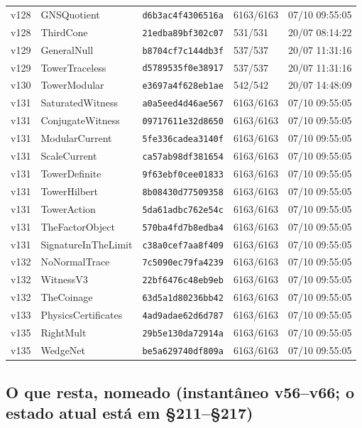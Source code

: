 \documentclass[11pt]{article}
\theoremstyle{definition}\newtheorem{deriv}{Derivação}
\begin{document}
{\begin{longtable}{@{}lllll@{}}
v128 & GNSQuotient & \texttt{d6b3ac4f4306516a} & 6163/6163 & 07/10 09:55:05 \\
v128 & ThirdCone & \texttt{21edba89bf302c07} & 531/531 & 20/07 08:14:22 \\
v129 & GeneralNull & \texttt{b8704cf7c144db3f} & 537/537 & 20/07 11:31:16 \\
v129 & TowerTraceless & \texttt{d5789535f0e38917} & 537/537 & 20/07 11:31:16 \\
v130 & TowerModular & \texttt{e3697a4f628eb1ae} & 542/542 & 20/07 14:48:09 \\
v131 & SaturatedWitness & \texttt{a0a5eed4d46ae567} & 6163/6163 & 07/10 09:55:05 \\
v131 & ConjugateWitness & \texttt{09717611e32d8650} & 6163/6163 & 07/10 09:55:05 \\
v131 & ModularCurrent & \texttt{5fe336cadea3140f} & 6163/6163 & 07/10 09:55:05 \\
v131 & ScaleCurrent & \texttt{ca57ab98df381654} & 6163/6163 & 07/10 09:55:05 \\
v131 & TowerDefinite & \texttt{9f63ebf0cee01833} & 6163/6163 & 07/10 09:55:05 \\
v131 & TowerHilbert & \texttt{8b08430d77509358} & 6163/6163 & 07/10 09:55:05 \\
v131 & TowerAction & \texttt{5da61adbc762e54c} & 6163/6163 & 07/10 09:55:05 \\
v131 & TheFactorObject & \texttt{570ba4fd7b8edba4} & 6163/6163 & 07/10 09:55:05 \\
v131 & SignatureInTheLimit & \texttt{c38a0cef7aa8f409} & 6163/6163 & 07/10 09:55:05 \\
v132 & NoNormalTrace & \texttt{7c5090ec79fa4239} & 6163/6163 & 07/10 09:55:05 \\
v132 & WitnessV3 & \texttt{22bf6476c48eb9eb} & 6163/6163 & 07/10 09:55:05 \\
v132 & TheCoinage & \texttt{63d5a1d80236bb42} & 6163/6163 & 07/10 09:55:05 \\
v133 & PhysicsCertificates & \texttt{4ad9adae62d6d787} & 6163/6163 & 07/10 09:55:05 \\
v135 & RightMult & \texttt{29b5e130da72914a} & 6163/6163 & 07/10 09:55:05 \\
v135 & WedgeNet & \texttt{be5a629740df809a} & 6163/6163 & 07/10 09:55:05 \\
\bottomrule\end{longtable}}

\subsection*{O que resta, nomeado (instantâneo v56--v66; o estado atual está em \S211--\S217)}
\end{document}

